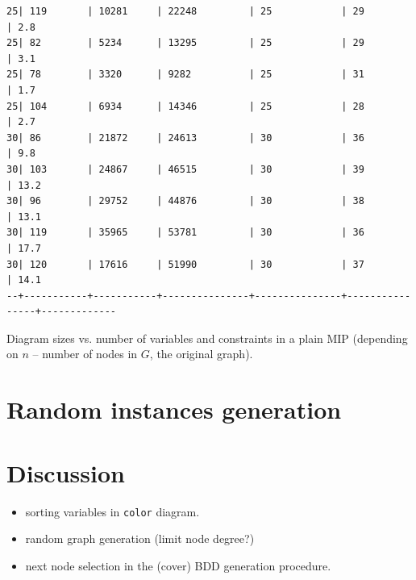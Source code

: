 \documentclass[11pt]{article}
\begin{document}
\begin{listing}[htbp]
\begin{verbatim}
25| 119       | 10281     | 22248         | 25            | 29             | 2.8
25| 82        | 5234      | 13295         | 25            | 29             | 3.1
25| 78        | 3320      | 9282          | 25            | 31             | 1.7
25| 104       | 6934      | 14346         | 25            | 28             | 2.7
30| 86        | 21872     | 24613         | 30            | 36             | 9.8
30| 103       | 24867     | 46515         | 30            | 39             | 13.2
30| 96        | 29752     | 44876         | 30            | 38             | 13.1
30| 119       | 35965     | 53781         | 30            | 36             | 17.7
30| 120       | 17616     | 51990         | 30            | 37             | 14.1
--+-----------+-----------+---------------+---------------+----------------+-------------
\end{verbatim}
\caption{\label{fig:sizes}Diagram sizes vs. number of variables and constraints in a plain MIP (depending on \(n\) -- number of nodes in \(G\), the original graph).}
\end{listing}

\section{Random instances generation}
\label{sec:org8668add}

\section{Discussion}
\label{sec:org55e4361}
\begin{itemize}
\item sorting variables in \texttt{color} diagram.
\item random graph generation (limit node degree?)
\item next node selection in the (cover) BDD generation procedure.
\end{itemize}
\end{document}

